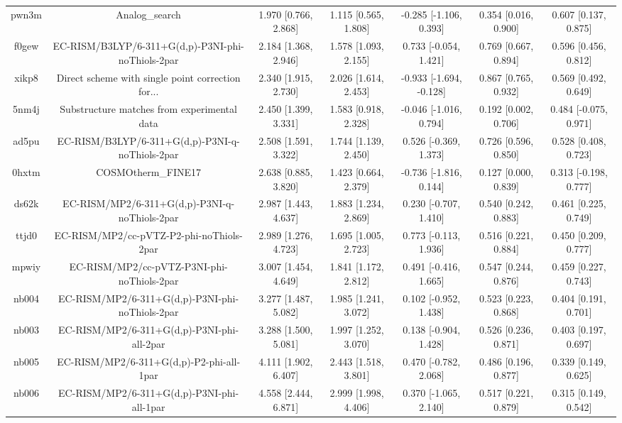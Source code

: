 \documentclass{article}
\begin{document}
\begin{center}
\begin{longtable}{|ccccccc|}
 pwn3m &                                     Analog\_search &  1.970 [0.766, 2.868] &  1.115 [0.565, 1.808] &   -0.285 [-1.106, 0.393] &  0.354 [0.016, 0.900] &   0.607 [0.137, 0.875] \\
 f0gew &  EC-RISM/B3LYP/6-311+G(d,p)-P3NI-phi-noThiols-2par &  2.184 [1.368, 2.946] &  1.578 [1.093, 2.155] &    0.733 [-0.054, 1.421] &  0.769 [0.667, 0.894] &   0.596 [0.456, 0.812] \\
 xikp8 &  Direct scheme with single point correction for... &  2.340 [1.915, 2.730] &  2.026 [1.614, 2.453] &  -0.933 [-1.694, -0.128] &  0.867 [0.765, 0.932] &   0.569 [0.492, 0.649] \\
 5nm4j &        Substructure matches from experimental data &  2.450 [1.399, 3.331] &  1.583 [0.918, 2.328] &   -0.046 [-1.016, 0.794] &  0.192 [0.002, 0.706] &  0.484 [-0.075, 0.971] \\
 ad5pu &    EC-RISM/B3LYP/6-311+G(d,p)-P3NI-q-noThiols-2par &  2.508 [1.591, 3.322] &  1.744 [1.139, 2.450] &    0.526 [-0.369, 1.373] &  0.726 [0.596, 0.850] &   0.528 [0.408, 0.723] \\
 0hxtm &                                 COSMOtherm\_FINE17 &  2.638 [0.885, 3.820] &  1.423 [0.664, 2.379] &   -0.736 [-1.816, 0.144] &  0.127 [0.000, 0.839] &  0.313 [-0.198, 0.777] \\
 ds62k &      EC-RISM/MP2/6-311+G(d,p)-P3NI-q-noThiols-2par &  2.987 [1.443, 4.637] &  1.883 [1.234, 2.869] &    0.230 [-0.707, 1.410] &  0.540 [0.242, 0.883] &   0.461 [0.225, 0.749] \\
 ttjd0 &           EC-RISM/MP2/cc-pVTZ-P2-phi-noThiols-2par &  2.989 [1.276, 4.723] &  1.695 [1.005, 2.723] &    0.773 [-0.113, 1.936] &  0.516 [0.221, 0.884] &   0.450 [0.209, 0.777] \\
 mpwiy &         EC-RISM/MP2/cc-pVTZ-P3NI-phi-noThiols-2par &  3.007 [1.454, 4.649] &  1.841 [1.172, 2.812] &    0.491 [-0.416, 1.665] &  0.547 [0.244, 0.876] &   0.459 [0.227, 0.743] \\
 nb004 &    EC-RISM/MP2/6-311+G(d,p)-P3NI-phi-noThiols-2par &  3.277 [1.487, 5.082] &  1.985 [1.241, 3.072] &    0.102 [-0.952, 1.438] &  0.523 [0.223, 0.868] &   0.404 [0.191, 0.701] \\
 nb003 &         EC-RISM/MP2/6-311+G(d,p)-P3NI-phi-all-2par &  3.288 [1.500, 5.081] &  1.997 [1.252, 3.070] &    0.138 [-0.904, 1.428] &  0.526 [0.236, 0.871] &   0.403 [0.197, 0.697] \\
 nb005 &           EC-RISM/MP2/6-311+G(d,p)-P2-phi-all-1par &  4.111 [1.902, 6.407] &  2.443 [1.518, 3.801] &    0.470 [-0.782, 2.068] &  0.486 [0.196, 0.877] &   0.339 [0.149, 0.625] \\
 nb006 &         EC-RISM/MP2/6-311+G(d,p)-P3NI-phi-all-1par &  4.558 [2.444, 6.871] &  2.999 [1.998, 4.406] &    0.370 [-1.065, 2.140] &  0.517 [0.221, 0.879] &   0.315 [0.149, 0.542] \\
\end{longtable}
\end{center}
\end{document}
